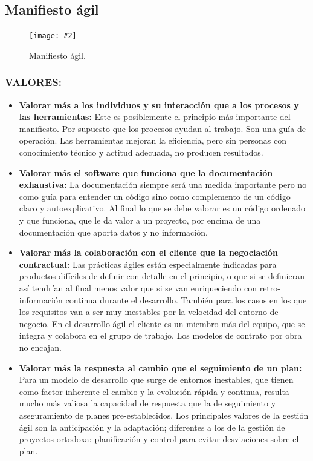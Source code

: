 \documentclass[12pt,a4paper,spanish]{book} %
\newcommand{\imgCentrada}[3]{
\begin{figure}[H]
\begin{center}
\texttt{[image: \#2]}
\caption{#3}
\label{#1}
\end{center}
\end{figure}
}
\begin{document}
\subsection{Manifiesto ágil}

\imgCentrada{fig.2.1}{img/manifest.eps}{Manifiesto ágil.}

\subsubsection{VALORES:}

\begin{itemize}
\item \textbf{Valorar más a los individuos y su interacción que a los procesos y las herramientas:} Este es posiblemente el principio más importante del manifiesto. Por supuesto que los procesos ayudan al trabajo. Son una guía de operación. Las herramientas mejoran la eficiencia, pero sin personas con conocimiento técnico y actitud adecuada, no producen resultados.
\item \textbf{Valorar más el software que funciona que la documentación exhaustiva:} La documentación siempre será una medida importante pero no como guía para entender un código sino como complemento de un código claro y autoexplicativo. Al final lo que se debe valorar es un código ordenado y que funciona, que le da valor a un proyecto, por encima de una documentación que aporta datos y no información.
\item \textbf{Valorar más la colaboración con el cliente que la negociación contractual:} Las prácticas ágiles están especialmente indicadas para productos difíciles de definir con detalle en el principio, o que si se definieran así tendrían al final menos valor que si se van enriqueciendo con retro-información continua durante el desarrollo. También para los casos en los que los requisitos van a ser muy inestables por la velocidad del entorno de negocio. En el desarrollo ágil el cliente es un miembro más del equipo, que se integra y colabora en el grupo de trabajo. Los modelos de contrato por obra no encajan.
\item \textbf{Valorar más la respuesta al cambio que el seguimiento de un plan:} Para un modelo de desarrollo que surge de entornos inestables, que tienen como factor inherente el cambio y la evolución rápida y continua, resulta mucho más valiosa la capacidad de respuesta que la de seguimiento y aseguramiento de planes pre-establecidos. Los principales valores de la gestión ágil son la anticipación y la adaptación; diferentes a los de la gestión de proyectos ortodoxa: planificación y control para evitar desviaciones sobre el plan.

\end{itemize}
\end{document}
